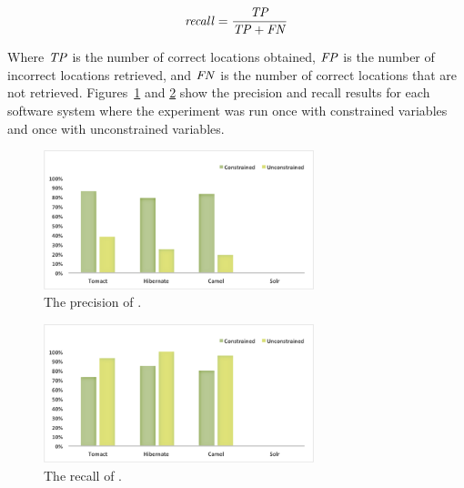 \begin{equation}\label{recall_eq}
\mathit{recall} = \frac{\mathit{TP}}{{\mathit{TP}+\mathit{FN}}}
\end{equation}


Where $\mathit{TP}$ is the number of correct locations obtained, $\mathit{FP}$ is the number of incorrect locations retrieved, and $\mathit{FN}$ is the number of correct locations that are not retrieved. Figures~\ref{fig:precision} and \ref{fig:recall} show the precision and recall results for each software system where the experiment was run once with constrained variables and once with unconstrained variables.


\begin{figure} [H]
  \centering\includegraphics [width = 0.7\textwidth, height = 0.3\textheight]{Charts/Precision.png}
  \caption{The precision of .}
  \label{fig:precision}
\end{figure}

\begin{figure} [H]
  \centering\includegraphics [width = 0.7\textwidth, height = 0.3\textheight]{Charts/Recall.png}
  \caption{The recall of .}
  \label{fig:recall}
\end{figure}

